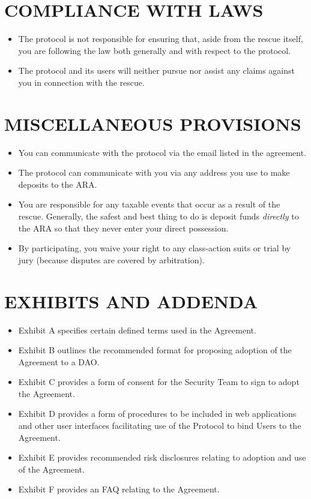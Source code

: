 \documentclass{article}
\begin{document}
\section{COMPLIANCE WITH LAWS}

\begin{itemize}
    \item The protocol is not responsible for ensuring that, aside from the rescue itself, you are following the law both generally and with respect to the protocol.
    \item The protocol and its users will neither pursue nor assist any claims against you in connection with the rescue.
\end{itemize}

\section{MISCELLANEOUS PROVISIONS}

\begin{itemize}
    \item You can communicate with the protocol via the email listed in the agreement.
    \item The protocol can communicate with you via any address you use to make deposits to the ARA.
    \item You are responsible for any taxable events that occur as a result of the rescue. Generally, the safest and best thing to do is deposit funds \textit{directly} to the ARA so that they never enter your direct possession.
    \item By participating, you waive your right to any class-action suits or trial by jury (because disputes are covered by arbitration).
\end{itemize}

\section{EXHIBITS AND ADDENDA}

\begin{itemize}
    \item Exhibit A specifies certain defined terms used in the Agreement.
    \item Exhibit B outlines the recommended format for proposing adoption of the Agreement to a DAO.
    \item Exhibit C provides a form of consent for the Security Team to sign to adopt the Agreement.
    \item Exhibit D provides a form of procedures to be included in web applications and other user interfaces facilitating use of the Protocol to bind Users to the Agreement.
    \item Exhibit E provides recommended risk disclosures relating to adoption and use of the Agreement.
    \item Exhibit F provides an FAQ relating to the Agreement.
\end{itemize}
\end{document}
